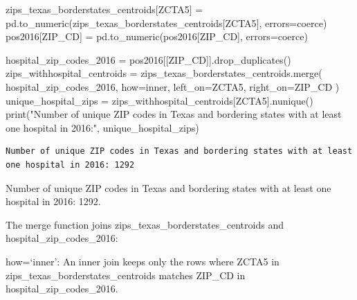 \documentclass[
  letterpaper,
  DIV=11,
  numbers=noendperiod]{scrartcl}
\newenvironment{Shaded}{\begin{snugshade}}{\end{snugshade}}
\newcommand{\BuiltInTok}[1]{\textcolor[rgb]{0.00,0.23,0.31}{#1}}
\newcommand{\NormalTok}[1]{\textcolor[rgb]{0.00,0.23,0.31}{#1}}
\newcommand{\OperatorTok}[1]{\textcolor[rgb]{0.37,0.37,0.37}{#1}}
\newcommand{\StringTok}[1]{\textcolor[rgb]{0.13,0.47,0.30}{#1}}
\begin{document}
\begin{Shaded}
\begin{Highlighting}[]
\NormalTok{zips\_texas\_borderstates\_centroids[}\StringTok{\textquotesingle{}ZCTA5\textquotesingle{}}\NormalTok{] }\OperatorTok{=}\NormalTok{ pd.to\_numeric(zips\_texas\_borderstates\_centroids[}\StringTok{\textquotesingle{}ZCTA5\textquotesingle{}}\NormalTok{], errors}\OperatorTok{=}\StringTok{\textquotesingle{}coerce\textquotesingle{}}\NormalTok{)}
\NormalTok{pos2016[}\StringTok{\textquotesingle{}ZIP\_CD\textquotesingle{}}\NormalTok{] }\OperatorTok{=}\NormalTok{ pd.to\_numeric(pos2016[}\StringTok{\textquotesingle{}ZIP\_CD\textquotesingle{}}\NormalTok{], errors}\OperatorTok{=}\StringTok{\textquotesingle{}coerce\textquotesingle{}}\NormalTok{)}


\NormalTok{hospital\_zip\_codes\_2016 }\OperatorTok{=}\NormalTok{ pos2016[[}\StringTok{\textquotesingle{}ZIP\_CD\textquotesingle{}}\NormalTok{]].drop\_duplicates()}
\NormalTok{zips\_withhospital\_centroids }\OperatorTok{=}\NormalTok{ zips\_texas\_borderstates\_centroids.merge(}
\NormalTok{    hospital\_zip\_codes\_2016,}
\NormalTok{    how}\OperatorTok{=}\StringTok{\textquotesingle{}inner\textquotesingle{}}\NormalTok{,}
\NormalTok{    left\_on}\OperatorTok{=}\StringTok{\textquotesingle{}ZCTA5\textquotesingle{}}\NormalTok{,}
\NormalTok{    right\_on}\OperatorTok{=}\StringTok{\textquotesingle{}ZIP\_CD\textquotesingle{}}
\NormalTok{)}
\NormalTok{unique\_hospital\_zips }\OperatorTok{=}\NormalTok{ zips\_withhospital\_centroids[}\StringTok{\textquotesingle{}ZCTA5\textquotesingle{}}\NormalTok{].nunique()}
\BuiltInTok{print}\NormalTok{(}\StringTok{"Number of unique ZIP codes in Texas and bordering states with at least one hospital in 2016:"}\NormalTok{, unique\_hospital\_zips)}
\end{Highlighting}
\end{Shaded}

\begin{verbatim}
Number of unique ZIP codes in Texas and bordering states with at least one hospital in 2016: 1292
\end{verbatim}

Number of unique ZIP codes in Texas and bordering states with at least
one hospital in 2016: 1292.

The merge function joins zips\_texas\_borderstates\_centroids and
hospital\_zip\_codes\_2016:

how=`inner': An inner join keeps only the rows where ZCTA5 in
zips\_texas\_borderstates\_centroids matches ZIP\_CD in
hospital\_zip\_codes\_2016.
\end{document}
